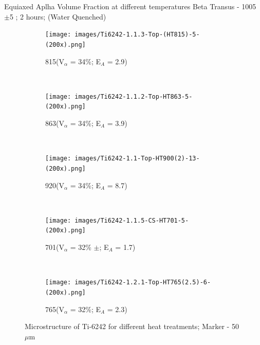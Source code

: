 \documentclass[10pt]{beamer}
\begin{document}

\begin{frame}{Equiaxed Aplha Volume Fraction at different temperatures}
Beta Transus - 1005 $\pm$5 \degC ; 2 hours; (Water Quenched)

\vspace{-10mm}

\begin{figure}[H]
    \centering
    \begin{subfigure}{0.25\textwidth}
        \texttt{[image: images/Ti6242-1.1.3-Top-(HT815)-5-(200x).png]}
        \caption{815\degC (V$_{\alpha}$ = 34\%; E$_{A}$ = 2.9)}
        \label{fig:Ti-6242 HT815}
    \end{subfigure}
    ~
    \begin{subfigure}{0.25\textwidth}
        \texttt{[image: images/Ti6242-1.1.2-Top-HT863-5-(200x).png]}
        \caption{863\degC (V$_{\alpha}$ = 34\%; E$_{A}$ = 3.9)}
        \label{fig:Ti-6242 HT863}
    \end{subfigure}
    ~
    \begin{subfigure}{0.25\textwidth}
        \texttt{[image: images/Ti6242-1.1-Top-HT900(2)-13-(200x).png]}
        \caption{920\degC (V$_{\alpha}$ = 34\%; E$_{A}$ = 8.7)}
        \label{fig:Ti-6242 HT920}
    \end{subfigure}   
    \\
        \begin{subfigure}{0.25\textwidth}
        \texttt{[image: images/Ti6242-1.1.5-CS-HT701-5-(200x).png]}
        \caption{701\degC (V$_{\alpha}$ = 32\% $\pm$; E$_{A}$ = 1.7)}
        \label{fig:Ti-6242 HT700}
    \end{subfigure}    
    ~
    \begin{subfigure}{0.25\textwidth}
        \texttt{[image: images/Ti6242-1.2.1-Top-HT765(2.5)-6-(200x).png]}
        \caption{765\degC (V$_{\alpha}$ = 32\%; E$_{A}$ = 2.3)}
        \label{fig:Ti-6242 HT752}
    \end{subfigure}      
   
    \caption{Microstructure of Ti-6242 for different heat treatments; Marker - 50$\mu$m}
    
\end{figure}
\end{frame}

\end{document}
